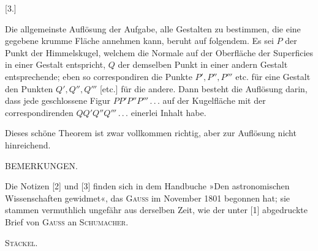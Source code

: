 %
\begin{center}[3.]\end{center}

Die allgemeinste Auflösung der Aufgabe, alle Gestalten zu bestimmen, die eine gegebene krumme Fläche annehmen kann, beruht auf folgendem. Es sei $P$ der Punkt der Himmelskugel, welchem die Normale auf der Oberfläche der Superficies in einer Gestalt entspricht, $Q$ der demselben Punkt in einer andern Gestalt entsprechende; eben so correspondiren die Punkte $P',P'',P'''$ etc. für eine Gestalt den Punkten $Q',Q'',Q'''$ [etc.] für die andere. Dann besteht die Auflösung darin, dass jede geschlossene Figur $PP'P''P'''\, .\, .\, .$ auf der Kugelfläche mit der correspondirenden $QQ'Q''Q'''\, .\, .\, .$ einerlei Inhalt habe.

 Dieses schöne Theorem ist zwar vollkommen richtig, aber zur Auflösung nicht hinreichend.

\begin{center}BEMERKUNGEN.\end{center}

Die Notizen [2] und [3] finden sich in dem Handbuche »Den astronomischen Wissenschaften gewidmet«, das \textsc{Gauss} im November 1801 begonnen hat; sie stammen vermuthlich ungefähr aus derselben Zeit, wie der unter [1] abgedruckte Brief von \textsc{Gauss} an \textsc{Schumacher}.
\begin{flushright}\textsc{Stäckel}.\end{flushright}
